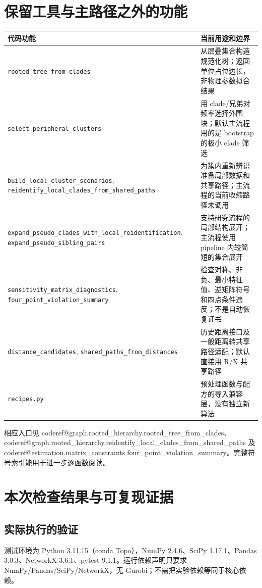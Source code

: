 \documentclass[UTF8,11pt,a4paper,fontset=windows]{ctexart}
\makeatletter
\newcommand{\CodeRef}[1]{\begingroup\small\csname coderef@#1\endcsname\endgroup}
\makeatother
\begin{document}
\section{保留工具与主路径之外的功能}
\begin{longtable}{P{6.8cm}P{8.1cm}}\toprule
代码功能 & 当前用途和边界\\\midrule\endhead
\nolinkurl{rooted_tree_from_clades} & 从层叠集合构造规范化树；返回单位占位边长，非物理参数拟合结果\\
\nolinkurl{select_peripheral_clusters} & 用 clade/兄弟对频率选择外围块；默认主流程用的是 bootstrap 的极小 clade 筛选\\
\nolinkurl{build_local_cluster_scenarios}, \nolinkurl{reidentify_local_clades_from_shared_paths} & 为簇内重新辨识准备局部数据和共享路径；主流程的当前收缩路径未调用\\
\nolinkurl{expand_pseudo_clades_with_local_reidentification}, \nolinkurl{expand_pseudo_sibling_pairs} & 支持研究流程的局部结构展开；主流程使用 pipeline 内较简短的集合展开\\
\nolinkurl{sensitivity_matrix_diagnostics}, \nolinkurl{four_point_violation_summary} & 检查对称、非负、最小特征值、逆矩阵符号和四点条件违反；不是自动恢复证书\\
\nolinkurl{distance_candidates}, \nolinkurl{shared_paths_from_distances} & 历史距离接口及一般距离转共享路径适配；默认直接用 R/X 共享路径\\
\nolinkurl{recipes.py} & 预处理函数与配方的导入兼容层，没有独立新算法\\
\bottomrule\end{longtable}
相应入口见 \CodeRef{graph.rooted_hierarchy.rooted_tree_from_clades}、\CodeRef{graph.rooted_hierarchy.reidentify_local_clades_from_shared_paths} 及 \CodeRef{estimation.matrix_constraints.four_point_violation_summary}。完整符号索引能用于进一步逐函数阅读。

\section{本次检查结果与可复现证据}
\subsection{实际执行的验证}
测试环境为 Python 3.11.15（conda Topo），NumPy 2.4.6、SciPy 1.17.1、Pandas 3.0.3、NetworkX 3.6.1、pytest 9.1.1。运行依赖声明只要求 NumPy/Pandas/SciPy/NetworkX，无 Gurobi；不需把实验依赖等同于核心依赖。
\end{document}

